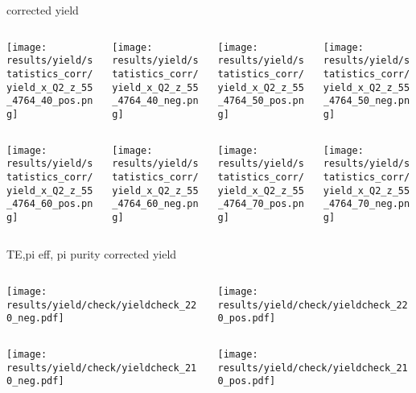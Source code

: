 \begin{frame}{corrected yield}
\begin{columns}
\begin{column}[T]{0.25\textwidth}
\texttt{[image: results/yield/statistics\_corr/yield\_x\_Q2\_z\_55\_4764\_40\_pos.png]}
\end{column}
\begin{column}[T]{0.25\textwidth}
\texttt{[image: results/yield/statistics\_corr/yield\_x\_Q2\_z\_55\_4764\_40\_neg.png]}
\end{column}
\begin{column}[T]{0.25\textwidth}
\texttt{[image: results/yield/statistics\_corr/yield\_x\_Q2\_z\_55\_4764\_50\_pos.png]}
\end{column}
\begin{column}[T]{0.25\textwidth}
\texttt{[image: results/yield/statistics\_corr/yield\_x\_Q2\_z\_55\_4764\_50\_neg.png]}
\end{column}
\end{columns}
\begin{columns}
\begin{column}[T]{0.25\textwidth}
\texttt{[image: results/yield/statistics\_corr/yield\_x\_Q2\_z\_55\_4764\_60\_pos.png]}
\end{column}
\begin{column}[T]{0.25\textwidth}
\texttt{[image: results/yield/statistics\_corr/yield\_x\_Q2\_z\_55\_4764\_60\_neg.png]}
\end{column}
\begin{column}[T]{0.25\textwidth}
\texttt{[image: results/yield/statistics\_corr/yield\_x\_Q2\_z\_55\_4764\_70\_pos.png]}
\end{column}
\begin{column}[T]{0.25\textwidth}
\texttt{[image: results/yield/statistics\_corr/yield\_x\_Q2\_z\_55\_4764\_70\_neg.png]}
\end{column}
\end{columns}
\end{frame}
\begin{frame}{TE,pi eff, pi purity corrected yield}
\begin{columns}
\begin{column}[T]{0.5\textwidth}
\texttt{[image: results/yield/check/yieldcheck\_220\_neg.pdf]}
\end{column}
\begin{column}[T]{0.5\textwidth}
\texttt{[image: results/yield/check/yieldcheck\_220\_pos.pdf]}
\end{column}
\end{columns}
\begin{columns}
\begin{column}[T]{0.5\textwidth}
\texttt{[image: results/yield/check/yieldcheck\_210\_neg.pdf]}
\end{column}
\begin{column}[T]{0.5\textwidth}
\texttt{[image: results/yield/check/yieldcheck\_210\_pos.pdf]}
\end{column}
\end{columns}
\end{frame}
